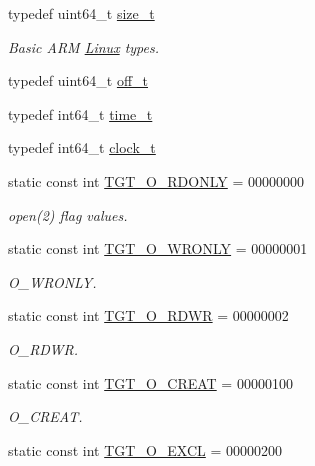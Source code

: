  \begin{DoxyCompactItemize}
\item 
typedef uint64\_\-t \hyperlink{classArmLinux64_a186ea1339bffb378854987065835afe3}{size\_\-t}
\begin{DoxyCompactList}\small\item\em Basic ARM \hyperlink{classLinux}{Linux} types. \item\end{DoxyCompactList}\item 
typedef uint64\_\-t \hyperlink{classArmLinux64_a2cb84cf5f02a29b7e8f237ff151a9225}{off\_\-t}
\item 
typedef int64\_\-t \hyperlink{classArmLinux64_a7f5991675a84025dc7c24754a9b257c0}{time\_\-t}
\item 
typedef int64\_\-t \hyperlink{classArmLinux64_a0001c50514d27f51d408e051dc803ad4}{clock\_\-t}
\item 
static const int \hyperlink{classArmLinux64_ad266b23a0ae07d1833e18bae651f3411}{TGT\_\-O\_\-RDONLY} = 00000000
\begin{DoxyCompactList}\small\item\em open(2) flag values. \item\end{DoxyCompactList}\item 
static const int \hyperlink{classArmLinux64_a6156c069cefe05ce3cce033b2e0c2de2}{TGT\_\-O\_\-WRONLY} = 00000001
\begin{DoxyCompactList}\small\item\em O\_\-WRONLY. \item\end{DoxyCompactList}\item 
static const int \hyperlink{classArmLinux64_ac6fa9ecf5d2f3314f197698f1099e2ac}{TGT\_\-O\_\-RDWR} = 00000002
\begin{DoxyCompactList}\small\item\em O\_\-RDWR. \item\end{DoxyCompactList}\item 
static const int \hyperlink{classArmLinux64_aec02e04ca367e6c3f4b46e4edc12efac}{TGT\_\-O\_\-CREAT} = 00000100
\begin{DoxyCompactList}\small\item\em O\_\-CREAT. \item\end{DoxyCompactList}\item 
static const int \hyperlink{classArmLinux64_a10d5d118d15b51ebdd4b16dc78342d1d}{TGT\_\-O\_\-EXCL} = 00000200

\end{DoxyCompactItemize}

